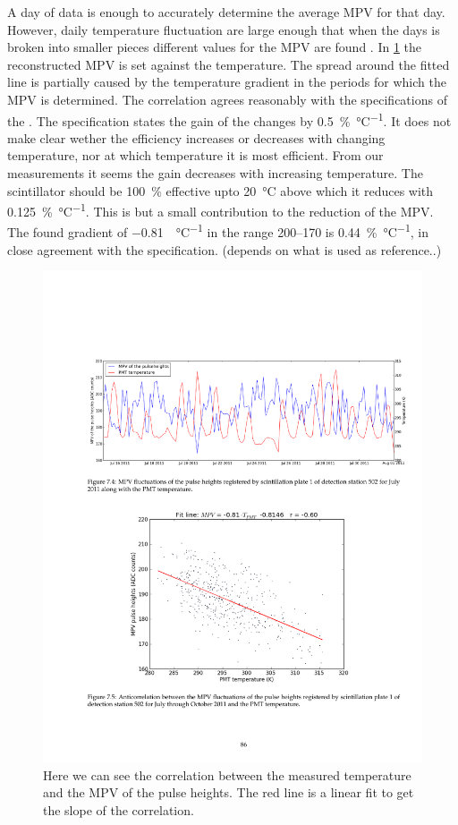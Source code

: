 A day of data is enough to accurately determine the average MPV for that day. However, daily temperature fluctuation are large enough that when the days is broken into smaller pieces different values for the MPV are found \cite{bartels2012mpv}. In \cref{fig:mpv_temperature} the reconstructed MPV is set against the \pmt temperature. The spread around the fitted line is partially caused by the temperature gradient in the periods for which the MPV is determined. The correlation agrees reasonably with the specifications of the \pmt. The specification states the gain of the \pmt changes by \SI{0.5}{\percent\per\degreeCelsius}. It does not make clear wether the efficiency increases or decreases with changing temperature, nor at which temperature it is most efficient. From our measurements it seems the gain decreases with increasing temperature. The scintillator should be \SI{100}{\percent} effective upto \SI{20}{\degreeCelsius} above which it reduces with \SI{0.125}{\percent\per\degreeCelsius}. This is but a small contribution to the reduction of the MPV. The found gradient of \SI{-0.81}{\adc\per\degreeCelsius} in the range \SIrange{200}{170}{\adc} is \SI{0.44}{\percent\per\degreeCelsius}, in close agreement with the specification. (depends on what is used as reference..)

\begin{figure}
    \centering
    \includegraphics[width=.7\linewidth]{plots/detector/mpv_temperature}
    \caption{Here we can see the correlation between the measured temperature and the MPV of the pulse heights. The red line is a linear fit to get the slope of the correlation.}
    \label{fig:mpv_temperature}
\end{figure}

